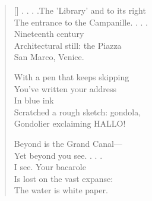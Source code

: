 \label{ch:postcard}
\settowidth{\versewidth}{The entrance to the Campanille. . . .}
\begin{verse}[\versewidth]
. . . .The 'Library' and to its right\\
The entrance to the Campanille. . . .\\
Nineteenth century\\
Architectural still: the Piazza\\
San Marco, Venice.

With a pen that keeps skipping\\
You've written your address\\
In blue ink\\
Scratched a rough sketch: gondola,\\
Gondolier exclaiming HALLO!

Beyond is the Grand Canal---\\
Yet beyond you see. . . .\\
I see.     Your bacarole\\
Is lost on the vast expanse:\\
The water is white paper.
\end{verse}
